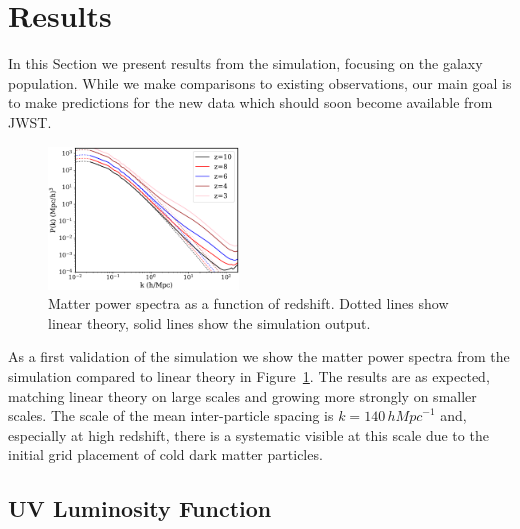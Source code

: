 \documentclass[fleqn,usenatbib]{mnras}
\newcommand{\hMpc}{\,h\unit{Mpc}^{-1}}
\begin{document}
\section{Results}
\label{sec:results}

In this Section we present results from the simulation, focusing on the galaxy population. While we make comparisons to existing observations, our main goal is to make predictions for the new data which should soon become available from JWST.

\begin{figure}
\centering
  \includegraphics[width=0.45\textwidth]{plots/matterpower.pdf}    
  \caption{Matter power spectra as a function of redshift. Dotted lines show linear theory, solid lines show the simulation output.}  
  \label{fig:matterpower}
\end{figure}

As a first validation of the simulation we show the matter power spectra from the simulation compared to linear theory in Figure~\ref{fig:matterpower}. The results are as expected, matching linear theory on large scales and growing more strongly on smaller scales. The scale of the mean inter-particle spacing is $k = 140 \hMpc$ and, especially at high redshift, there is a systematic visible at this scale due to the initial grid placement of cold dark matter particles.

\subsection{UV Luminosity Function}
\label{sec:uvlf}
\end{document}
